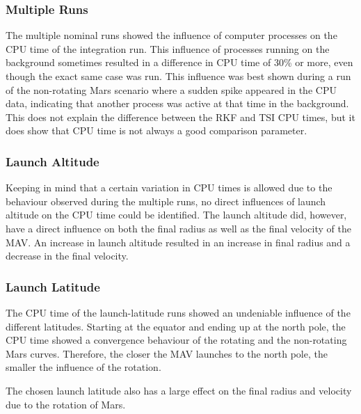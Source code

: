 
\subsubsection{Multiple Runs}
The multiple nominal runs showed the influence of computer processes on the CPU time of the integration run. This influence of processes running on the background sometimes resulted in a difference in CPU time of 30\% or more, even though the exact same case was run. This influence was best shown during a run of the non-rotating Mars scenario where a sudden spike appeared in the CPU data, indicating that another process was active at that time in the background. This does not explain the difference between the \ac{RKF} and \ac{TSI} CPU times, but it does show that CPU time is not always a good comparison parameter.


\subsubsection{Launch Altitude}
Keeping in mind that a certain variation in CPU times is allowed due to the behaviour observed during the multiple runs, no direct influences of launch altitude on the CPU time could be identified. The launch altitude did, however, have a direct influence on both the final radius as well as the final velocity of the \ac{MAV}. An increase in launch altitude resulted in an increase in final radius and a decrease in the final velocity. 

\subsubsection{Launch Latitude}
The CPU time of the launch-latitude runs showed an undeniable influence of the different latitudes. Starting at the equator and ending up at the north pole, the CPU time showed a convergence behaviour of the rotating and the non-rotating Mars curves. Therefore, the closer the \ac{MAV} launches to the north pole, the smaller the influence of the rotation. 

The chosen launch latitude also has a large effect on the final radius and velocity due to the rotation of Mars. 



